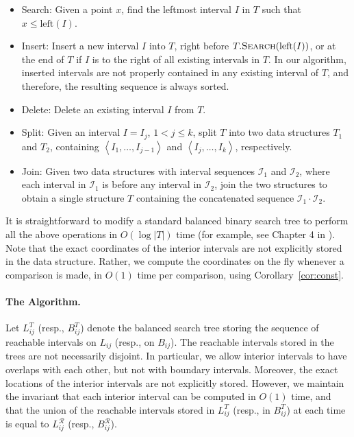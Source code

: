 \documentclass[12pt]{dalthesis}
\newcommand{\lee}{\leqslant}
\newcommand{\seq}[1]{{\left< #1 \right>}}
\newcommand{\CR}{{\mathscr R}}
\newcommand{\CI}{{\mathscr I}}
\newcommand{\LR}{L^\CR}
\newcommand{\BR}{B^\CR}
\newcommand{\LT}{L^{T}}
\newcommand{\BT}{B^{T}}
\newcommand{\Left}{\mbox{left}}
\begin{document}
\begin{itemize}
	\item[] {\sc Search:} 
		Given a point $x$, find the leftmost interval $I$ in $T$ such that $x \lee \Left(I)$.
	\item[] {\sc Insert:} 
		Insert a new interval $I$ into $T$, right before $T.\mbox{\sc Search}(\Left(I))$,
		or at the end of $T$ if $I$ is to the right of all existing intervals in $T$. In our algorithm, inserted intervals are not properly contained in any existing interval of $T$, and therefore, the
		resulting sequence is always sorted.
	\item[] {\sc Delete:} 
		Delete an existing interval $I$ from $T$. 
	\item[] {\sc Split:} 
		Given an interval $I = I_j$, $1 < j \lee k$, split $T$ into 
		two data structures $T_1$ and $T_2$, containing $\seq{I_1, \ldots, I_{j-1}}$ and  $\seq{I_j, \ldots, I_k}$, respectively. 
	\item[] {\sc Join:} 
		Given two data structures with interval sequences $\CI_1$ and $\CI_2$,
		where each interval in $\CI_1$ is before any interval in $\CI_2$,
		join the two structures to obtain a single structure $T$ 
		containing the concatenated sequence $\CI_1 \cdot \CI_2$.
\end{itemize}

It is straightforward to 
modify a standard balanced binary search tree
to perform all the above operations in $O(\log |T|)$ time
(for example, see Chapter 4 in \cite{Tarjan83}).
Note that the exact coordinates of the interior intervals are not explicitly stored in the data structure.
Rather, we compute the coordinates on the fly whenever a comparison is made, 
in $O(1)$ time per comparison,  using Corollary~\ref{cor:const}.


\paragraph{The Algorithm.}

Let $\LT_{ij}$ (resp., $\BT_{ij}$) denote the balanced search tree
storing the sequence of reachable intervals on $L_{ij}$ (resp., on $B_{ij}$).
The reachable intervals stored in the trees are not necessarily disjoint.
In particular, we allow interior intervals to have overlaps with each other, 
but not with boundary intervals.
Moreover, the exact locations of the interior intervals are not explicitly stored.
However, we maintain the invariant that 
each interior interval can be computed in $O(1)$ time, and that 
the union of the reachable intervals 
stored in $\LT_{ij}$ (resp., in $\BT_{ij}$) 
at each time is equal to  $\LR_{ij}$ (resp., $\BR_{ij}$).
\end{document}
